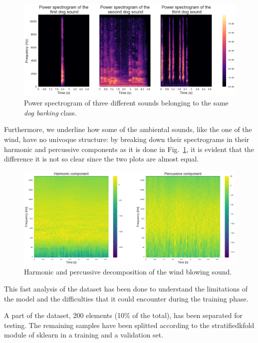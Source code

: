 \documentclass{article}
\begin{document}
\begin{sloppy}
\begin{figure}[ht]
  \centering
  \centerline{\includegraphics[width=\columnwidth]{dog_barking.png}}
  \caption{Power spectrogram of three different sounds belonging to the same \textit{dog barking} class.}
  \label{fig:Dog_barking}
\end{figure}

Furthermore, we underline how some of the ambiental sounds, like the one of the wind, have no univoque structure: by breaking down their
spectrograms in their harmonic and percussive components as it is done in Fig.~\ref{fig:Dog_barking}, it is evident that the difference
it is not so clear since the two plots are almost equal.

\begin{figure}[ht]
  \centering
  \centerline{\includegraphics[width=\columnwidth]{Harmonic_Percussive_Wind.png}}
  \caption{Harmonic and percussive decomposition of the wind blowing sound.}
  \label{fig:Harmonic_Percussive_Wind}
\end{figure}

This fast analysis of the dataset has been done to understand the limitations of the model and the difficulties that it could encounter during the training phase.

A part of the dataset, 200 elements (10\% of the total), has been separated for testing. The remaining samples have been splitted according to the stratifiedkfold module of sklearn \cite{scikit-learn_stratifiedkfold} in a training and a validation set.


\end{sloppy}
\end{document}
